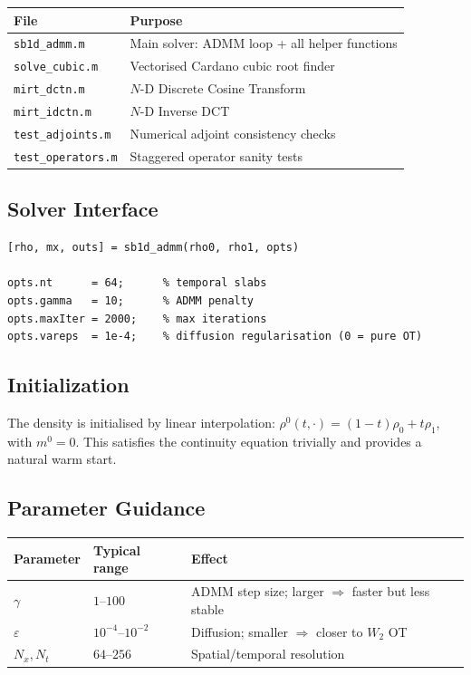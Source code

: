 \documentclass[11pt]{article}
\newcommand{\rhoO}{\rho_0}
\newcommand{\rhoT}{\rho_1}
\begin{document}
\begin{center}
\begin{tabular}{ll}
\toprule
File & Purpose \\
\midrule
\texttt{sb1d\_admm.m}     & Main solver: ADMM loop + all helper functions \\
\texttt{solve\_cubic.m}   & Vectorised Cardano cubic root finder \\
\texttt{mirt\_dctn.m}     & $N$-D Discrete Cosine Transform \\
\texttt{mirt\_idctn.m}    & $N$-D Inverse DCT \\
\texttt{test\_adjoints.m} & Numerical adjoint consistency checks \\
\texttt{test\_operators.m}& Staggered operator sanity tests \\
\bottomrule
\end{tabular}
\end{center}

\subsection{Solver Interface}

\begin{verbatim}
[rho, mx, outs] = sb1d_admm(rho0, rho1, opts)

opts.nt      = 64;      % temporal slabs
opts.gamma   = 10;      % ADMM penalty
opts.maxIter = 2000;    % max iterations
opts.vareps  = 1e-4;    % diffusion regularisation (0 = pure OT)
\end{verbatim}

\subsection{Initialization}

The density is initialised by linear interpolation:
$\rho^0(t,\cdot) = (1-t)\rhoO + t\rhoT$, with $m^0 = 0$.
This satisfies the continuity equation trivially and provides a natural
warm start.

\subsection{Parameter Guidance}

\begin{center}
\begin{tabular}{lll}
\toprule
Parameter & Typical range & Effect \\
\midrule
$\gamma$ & $1$--$100$ & ADMM step size; larger $\Rightarrow$ faster but less stable \\
$\varepsilon$ & $10^{-4}$--$10^{-2}$ & Diffusion; smaller $\Rightarrow$ closer to $W_2$ OT \\
$N_x, N_t$ & $64$--$256$ & Spatial/temporal resolution \\
\bottomrule
\end{tabular}
\end{center}
\end{document}

